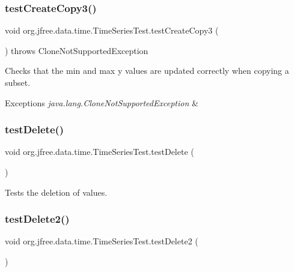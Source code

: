 \subsubsection{\texorpdfstring{test\+Create\+Copy3()}{testCreateCopy3()}}
{\footnotesize\ttfamily void org.\+jfree.\+data.\+time.\+Time\+Series\+Test.\+test\+Create\+Copy3 (\begin{DoxyParamCaption}{ }\end{DoxyParamCaption}) throws Clone\+Not\+Supported\+Exception}

Checks that the min and max y values are updated correctly when copying a subset.


\begin{DoxyExceptions}{Exceptions}
{\em java.\+lang.\+Clone\+Not\+Supported\+Exception} & \\
\hline
\end{DoxyExceptions}
\mbox{\label{classorg_1_1jfree_1_1data_1_1time_1_1_time_series_test_a578ed5b022d66b95cf33ec66c5b080aa}} 
\subsubsection{\texorpdfstring{test\+Delete()}{testDelete()}}
{\footnotesize\ttfamily void org.\+jfree.\+data.\+time.\+Time\+Series\+Test.\+test\+Delete (\begin{DoxyParamCaption}{ }\end{DoxyParamCaption})}

Tests the deletion of values. \mbox{\label{classorg_1_1jfree_1_1data_1_1time_1_1_time_series_test_a7a273c2b441b5bd965c470f541a582c3}} 
\subsubsection{\texorpdfstring{test\+Delete2()}{testDelete2()}}
{\footnotesize\ttfamily void org.\+jfree.\+data.\+time.\+Time\+Series\+Test.\+test\+Delete2 (\begin{DoxyParamCaption}{ }\end{DoxyParamCaption})}

